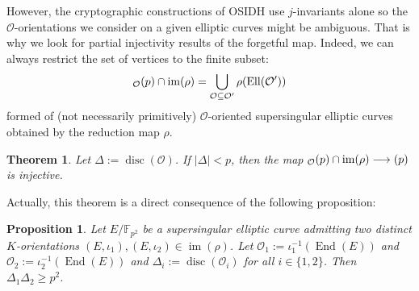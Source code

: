 \documentclass[a4paper,10pt]{report}
\theoremstyle{definition}
\theoremstyle{plain}
\newtheorem{proposition}[definition]{Proposition}
\newtheorem{theorem}[definition]{Theorem}
\theoremstyle{definition}
\newcommand{\N}{\mathbb{N}}
\newcommand{\Z}{\mathbb{Z}}
\newcommand{\F}{\mathbb{F}}
\newcommand{\mO}{\mathcal{O}}
\DeclareMathOperator{\im}{im}
\renewcommand{\(}{\left(}
\renewcommand{\)}{\right)}
\DeclareMathOperator{\End}{End}
\DeclareMathOperator{\disc}{disc}
\let\SS\relax
\DeclareMathOperator{\SS}{SS}
\DeclareMathOperator{\Ell}{Ell}
\begin{document}
However, the cryptographic constructions of OSIDH use $j$-invariants alone so the $\mO$-orientations we consider on a given elliptic curves might be ambiguous.  That is why we look for partial injectivity results of the forgetful map.  Indeed, we can always restrict the set of vertices to the finite subset:
\[\SS_{\mO}(p)\cap\im(\rho)=\bigcup_{\mO\subseteq\mO'}\rho(\Ell(\mO'))\]
formed of (not necessarily primitively) $\mO$-oriented supersingular elliptic curves obtained by the reduction map $\rho$.




\begin{theorem}\label{theorem 4}
Let $\Delta:=\disc(\mO)$. If $|\Delta|<p$, then the map $\SS_{\mO}(p)\cap\im(\rho)\longrightarrow\SS(p)$ is injective.
\end{theorem}

Actually, this theorem is a direct consequence of the following proposition:

\begin{proposition}\label{proposition 7}
Let $E/\F_{p^2}$ be a supersingular elliptic curve admitting two distinct $K$-orientations $(E,\iota_1),(E,\iota_2)\in\im(\rho)$.  Let $\mO_1:=\iota_1^{-1}(\End(E))$ and $\mO_2:=\iota_2^{-1}(\End(E))$ and $\Delta_i:=\disc(\mO_i)$ for all $i\in\{1,2\}$.  Then $\Delta_1\Delta_2\geq p^2$.
\end{proposition}
\end{document}
